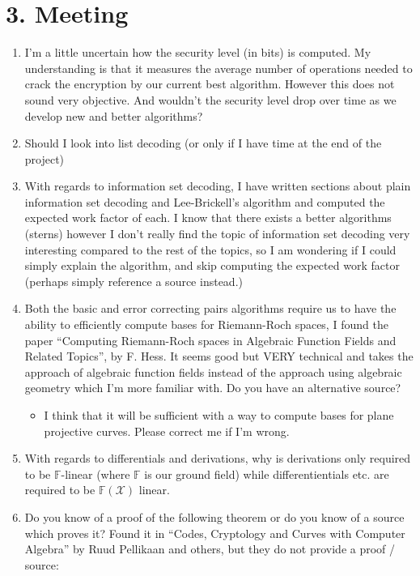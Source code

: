 \documentclass[11pt]{article}
\begin{document}
\newpage
\section*{3. Meeting}
\begin{enumerate}
  \item I'm a little uncertain how the security level (in bits) is computed. My understanding is that it measures the average number of operations needed to crack the encryption by our current best algorithm. However this does not sound very objective. And wouldn't the security level drop over time as we develop new and better algorithms?
  \item Should I look into list decoding (or only if I have time at the end of the project)
  \item With regards to information set decoding, I have written sections about plain information set decoding and Lee-Brickell's algorithm and computed the expected work factor of each. I know that there exists a better algorithms (sterns) however I don't really find the topic of information set decoding very interesting compared to the rest of the topics, so I am wondering if I could simply explain the algorithm, and skip computing the expected work factor (perhaps simply reference a source instead.)
  \item Both the basic and error correcting pairs algorithms require us to have the ability to efficiently compute bases for Riemann-Roch spaces, I found the paper ``Computing Riemann-Roch spaces in Algebraic Function Fields and Related Topics'', by F. Hess. It seems good but VERY technical and takes the approach of algebraic function fields instead of the approach using algebraic geometry which I'm more familiar with. Do you have an alternative source?
  \begin{itemize}
  \item I think that it will be sufficient with a way to compute bases for plane projective curves. Please correct me if I'm wrong.
  \end{itemize}
  \item With regards to differentials and derivations, why is derivations only required to be $\mathbb{F}$-linear (where $\mathbb{F}$ is our ground field) while differentientials etc. are required to be $\mathbb{F}(\mathcal{X})$ linear.
  \item Do you know of a proof of the following theorem or do you know of a source which proves it? Found it in ``Codes, Cryptology and Curves with Computer Algebra'' by Ruud Pellikaan and others, but they do not provide a proof / source:

\end{enumerate}
\end{document}
